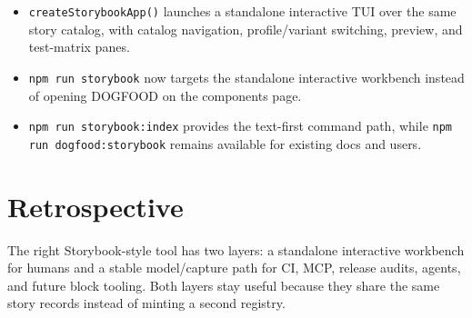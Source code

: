 \begin{itemize}
\item
  \texttt{c\allowbreak{}r\allowbreak{}e\allowbreak{}a\allowbreak{}t\allowbreak{}e\allowbreak{}S\allowbreak{}t\allowbreak{}o\allowbreak{}r\allowbreak{}y\allowbreak{}b\allowbreak{}o\allowbreak{}o\allowbreak{}k\allowbreak{}A\allowbreak{}p\allowbreak{}p\allowbreak{}(\allowbreak{})} launches a standalone interactive TUI over the same story catalog, with catalog navigation, profile/variant switching, preview, and test-matrix panes.
\item
  \texttt{n\allowbreak{}p\allowbreak{}m\allowbreak{} \allowbreak{}r\allowbreak{}u\allowbreak{}n\allowbreak{} \allowbreak{}s\allowbreak{}t\allowbreak{}o\allowbreak{}r\allowbreak{}y\allowbreak{}b\allowbreak{}o\allowbreak{}o\allowbreak{}k} now targets the standalone interactive workbench instead of opening DOGFOOD on the components page.
\item
  \texttt{n\allowbreak{}p\allowbreak{}m\allowbreak{} \allowbreak{}r\allowbreak{}u\allowbreak{}n\allowbreak{} \allowbreak{}s\allowbreak{}t\allowbreak{}o\allowbreak{}r\allowbreak{}y\allowbreak{}b\allowbreak{}o\allowbreak{}o\allowbreak{}k\allowbreak{}:\allowbreak{}i\allowbreak{}n\allowbreak{}d\allowbreak{}e\allowbreak{}x} provides the text-first command path, while \texttt{n\allowbreak{}p\allowbreak{}m\allowbreak{} \allowbreak{}r\allowbreak{}u\allowbreak{}n\allowbreak{} \allowbreak{}d\allowbreak{}o\allowbreak{}g\allowbreak{}f\allowbreak{}o\allowbreak{}o\allowbreak{}d\allowbreak{}:\allowbreak{}s\allowbreak{}t\allowbreak{}o\allowbreak{}r\allowbreak{}y\allowbreak{}b\allowbreak{}o\allowbreak{}o\allowbreak{}k} remains available for existing docs and users.
\end{itemize}

\section{Retrospective}\label{record-088-retrospective}

The right Storybook-style tool has two layers: a standalone interactive workbench for humans and a stable model/capture path for CI, MCP, release audits, agents, and future block tooling. Both layers stay useful because they share the same story records instead of minting a second registry.


